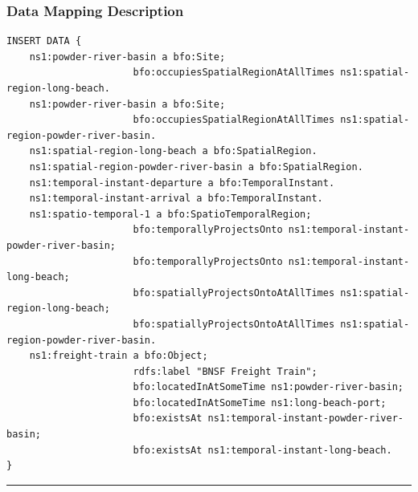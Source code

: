 \subsubsection*{Data Mapping Description}

\begin{verbatim}
INSERT DATA {
    ns1:powder-river-basin a bfo:Site; 
                      bfo:occupiesSpatialRegionAtAllTimes ns1:spatial-region-long-beach.
    ns1:powder-river-basin a bfo:Site; 
                      bfo:occupiesSpatialRegionAtAllTimes ns1:spatial-region-powder-river-basin.
    ns1:spatial-region-long-beach a bfo:SpatialRegion.
    ns1:spatial-region-powder-river-basin a bfo:SpatialRegion.
    ns1:temporal-instant-departure a bfo:TemporalInstant.
    ns1:temporal-instant-arrival a bfo:TemporalInstant.
    ns1:spatio-temporal-1 a bfo:SpatioTemporalRegion;
                      bfo:temporallyProjectsOnto ns1:temporal-instant-powder-river-basin;
                      bfo:temporallyProjectsOnto ns1:temporal-instant-long-beach;
                      bfo:spatiallyProjectsOntoAtAllTimes ns1:spatial-region-long-beach;
                      bfo:spatiallyProjectsOntoAtAllTimes ns1:spatial-region-powder-river-basin. 
    ns1:freight-train a bfo:Object;
                      rdfs:label "BNSF Freight Train";   
                      bfo:locatedInAtSomeTime ns1:powder-river-basin;
                      bfo:locatedInAtSomeTime ns1:long-beach-port;
                      bfo:existsAt ns1:temporal-instant-powder-river-basin;
                      bfo:existsAt ns1:temporal-instant-long-beach.               
}
\end{verbatim}
\noindent\rule{\linewidth}{0.1pt}
